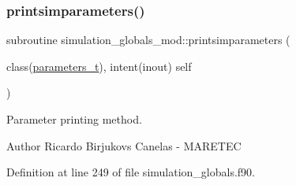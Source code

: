 \subsubsection{\texorpdfstring{printsimparameters()}{printsimparameters()}}
{\footnotesize\ttfamily subroutine simulation\+\_\+globals\+\_\+mod\+::printsimparameters (\begin{DoxyParamCaption}\item[{class(\mbox{\hyperlink{structsimulation__globals__mod_1_1parameters__t}{parameters\+\_\+t}}), intent(inout)}]{self }\end{DoxyParamCaption})\hspace{0.3cm}{\ttfamily [private]}}



Parameter printing method. 

\begin{DoxyAuthor}{Author}
Ricardo Birjukovs Canelas -\/ M\+A\+R\+E\+T\+EC 
\end{DoxyAuthor}


Definition at line 249 of file simulation\+\_\+globals.\+f90.


